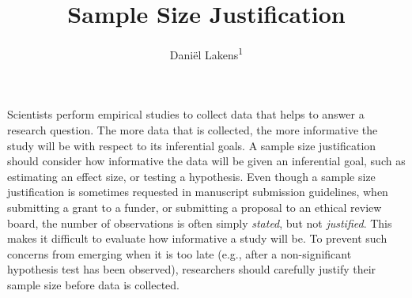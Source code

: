 \documentclass[
  english,
  ,jou,floatsintext]{apa6}
\title{Sample Size Justification}
\author{Daniël Lakens\textsuperscript{1}}
\date{}
\affiliation{\vspace{0.5cm}\textsuperscript{1} Eindhoven University of Technology}
\begin{document}
\maketitle

Scientists perform empirical studies to collect data that helps to answer a research question. The more data that is collected, the more informative the study will be with respect to its inferential goals. A sample size justification should consider how informative the data will be given an inferential goal, such as estimating an effect size, or testing a hypothesis. Even though a sample size justification is sometimes requested in manuscript submission guidelines, when submitting a grant to a funder, or submitting a proposal to an ethical review board, the number of observations is often simply \emph{stated}, but not \emph{justified}. This makes it difficult to evaluate how informative a study will be. To prevent such concerns from emerging when it is too late (e.g., after a non-significant hypothesis test has been observed), researchers should carefully justify their sample size before data is collected.
\end{document}
